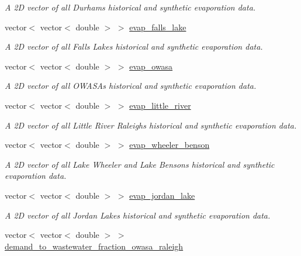 \begin{DoxyCompactItemize}
\begin{DoxyCompactList}\small\item\em A 2D vector of all Durham\textquotesingle{}s historical and synthetic evaporation data. \end{DoxyCompactList}\item 
vector$<$ vector$<$ double $>$ $>$ \mbox{\hyperlink{classTriangle_a4ad865bba9e2b65233aa453ea95d1950}{evap\+\_\+falls\+\_\+lake}}
\begin{DoxyCompactList}\small\item\em A 2D vector of all Falls Lake\textquotesingle{}s historical and synthetic evaporation data. \end{DoxyCompactList}\item 
vector$<$ vector$<$ double $>$ $>$ \mbox{\hyperlink{classTriangle_a9b1fbfcfe6230372f486382bd3b47717}{evap\+\_\+owasa}}
\begin{DoxyCompactList}\small\item\em A 2D vector of all O\+W\+A\+SA\textquotesingle{}s historical and synthetic evaporation data. \end{DoxyCompactList}\item 
vector$<$ vector$<$ double $>$ $>$ \mbox{\hyperlink{classTriangle_a48c51eabed2ace852d31b1df2e98f8d4}{evap\+\_\+little\+\_\+river}}
\begin{DoxyCompactList}\small\item\em A 2D vector of all Little River Raleigh\textquotesingle{}s historical and synthetic evaporation data. \end{DoxyCompactList}\item 
vector$<$ vector$<$ double $>$ $>$ \mbox{\hyperlink{classTriangle_a03a6df04c98f4a9030de3da381155cd8}{evap\+\_\+wheeler\+\_\+benson}}
\begin{DoxyCompactList}\small\item\em A 2D vector of all Lake Wheeler and Lake Benson\textquotesingle{}s historical and synthetic evaporation data. \end{DoxyCompactList}\item 
vector$<$ vector$<$ double $>$ $>$ \mbox{\hyperlink{classTriangle_aa340181943eedb577bf81215e34701f5}{evap\+\_\+jordan\+\_\+lake}}
\begin{DoxyCompactList}\small\item\em A 2D vector of all Jordan Lake\textquotesingle{}s historical and synthetic evaporation data. \end{DoxyCompactList}\item 
vector$<$ vector$<$ double $>$ $>$ \mbox{\hyperlink{classTriangle_ac1aeb61eae9f469b139c38d688235724}{demand\+\_\+to\+\_\+wastewater\+\_\+fraction\+\_\+owasa\+\_\+raleigh}}

\end{DoxyCompactItemize}
